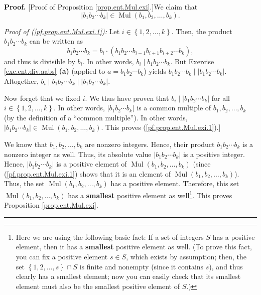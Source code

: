 \documentclass[numbers=enddot,12pt,final,onecolumn,notitlepage]{scrartcl}%
\numberwithin{exer}{subsection}
\theoremstyle{definition}
\newenvironment{proof}[1][Proof]{\noindent\textbf{#1.} }{\ \rule{0.5em}{0.5em}}
\begin{document}
\begin{proof}
[Proof of Proposition \ref{prop.ent.Mul.exi}.]We claim that%
\begin{equation}
\left\vert b_{1}b_{2}\cdots b_{k}\right\vert \in\operatorname*{Mul}\left(
b_{1},b_{2},\ldots,b_{k}\right)  . \label{pf.prop.ent.Mul.exi.1}%
\end{equation}


\textit{Proof of (\ref{pf.prop.ent.Mul.exi.1}):} Let $i\in\left\{
1,2,\ldots,k\right\}  $. Then, the product $b_{1}b_{2}\cdots b_{k}$ can be
written as%
\[
b_{1}b_{2}\cdots b_{k}=b_{i}\cdot\left(  b_{1}b_{2}\cdots b_{i-1}%
b_{i+1}b_{i+2}\cdots b_{k}\right)  ,
\]
and thus is divisible by $b_{i}$. In other words, $b_{i}\mid b_{1}b_{2}\cdots
b_{k}$. But Exercise \ref{exe.ent.div.aabs} \textbf{(a)} (applied to
$a=b_{1}b_{2}\cdots b_{k}$) yields $b_{1}b_{2}\cdots b_{k}\mid\left\vert
b_{1}b_{2}\cdots b_{k}\right\vert $. Altogether, $b_{i}\mid b_{1}b_{2}\cdots
b_{k}\mid\left\vert b_{1}b_{2}\cdots b_{k}\right\vert $.

Now forget that we fixed $i$. We thus have proven that $b_{i}\mid\left\vert
b_{1}b_{2}\cdots b_{k}\right\vert $ for all $i\in\left\{  1,2,\ldots
,k\right\}  $. In other words, $\left\vert b_{1}b_{2}\cdots b_{k}\right\vert $
is a common multiple of $b_{1},b_{2},\ldots,b_{k}$ (by the definition of a
\textquotedblleft common multiple\textquotedblright). In other words,
$\left\vert b_{1}b_{2}\cdots b_{k}\right\vert \in\operatorname*{Mul}\left(
b_{1},b_{2},\ldots,b_{k}\right)  $. This proves (\ref{pf.prop.ent.Mul.exi.1}).]

We know that $b_{1},b_{2},\ldots,b_{k}$ are nonzero integers. Hence, their
product $b_{1}b_{2}\cdots b_{k}$ is a nonzero integer as well. Thus, its
absolute value $\left\vert b_{1}b_{2}\cdots b_{k}\right\vert $ is a positive
integer. Hence, $\left\vert b_{1}b_{2}\cdots b_{k}\right\vert $ is a positive
element of $\operatorname*{Mul}\left(  b_{1},b_{2},\ldots,b_{k}\right)  $
(since (\ref{pf.prop.ent.Mul.exi.1}) shows that it is an element of
$\operatorname*{Mul}\left(  b_{1},b_{2},\ldots,b_{k}\right)  $). Thus, the set
$\operatorname*{Mul}\left(  b_{1},b_{2},\ldots,b_{k}\right)  $ has a positive
element. Therefore, this set $\operatorname*{Mul}\left(  b_{1},b_{2}%
,\ldots,b_{k}\right)  $ has a \textbf{smallest} positive element as
well\footnote{Here we are using the following basic fact: If a set of integers
$S$ has a positive element, then it has a \textbf{smallest} positive element
as well. (To prove this fact, you can fix a positive element $s\in S$, which
exists by assumption; then, the set $\left\{  1,2,\ldots,s\right\}  \cap S$ is
finite and nonempty (since it contains $s$), and thus clearly has a smallest
element; now you can easily check that its smallest element must also be the
smallest positive element of $S$.)}. This proves Proposition
\ref{prop.ent.Mul.exi}.
\end{proof}
\end{document}
